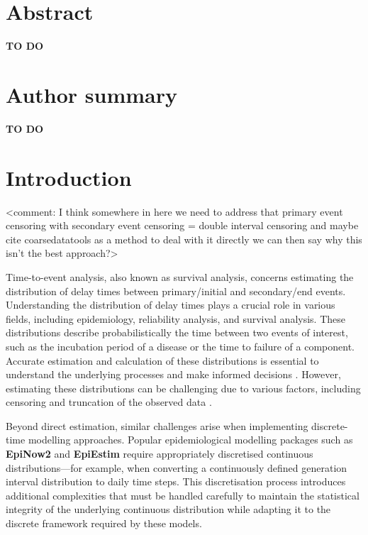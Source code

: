 \documentclass[10pt,letterpaper]{article}
\begin{document}
\section*{Abstract}
\textbf{TO DO}



\section*{Author summary}
\textbf{TO DO}

\linenumbers

\section*{Introduction}

<comment: I think somewhere in here we need to address that primary event censoring with secondary event censoring = double interval censoring and maybe cite coarsedatatools as a method to deal with it directly we can then say why this isn't the best approach?>

Time-to-event analysis, also known as survival analysis, concerns estimating the distribution of delay times between primary/initial and secondary/end events. Understanding the distribution of delay times plays a crucial role in various fields, including epidemiology, reliability analysis, and survival analysis. These distributions describe probabilistically the time between two events of interest, such as the incubation period of a disease or the time to failure of a component. Accurate estimation and calculation of these distributions is essential to understand the underlying processes and make informed decisions \cite{charniga2024best}. However, estimating these distributions can be challenging due to various factors, including censoring and truncation of the observed data \cite{Park2024.01.12.24301247}.

Beyond direct estimation, similar challenges arise when implementing discrete-time modelling approaches. Popular epidemiological modelling packages such as \textbf{EpiNow2} \cite{abbottepinow2} and \textbf{EpiEstim} \cite{Cori2013} require appropriately discretised continuous distributions—for example, when converting a continuously defined generation interval distribution to daily time steps. This discretisation process introduces additional complexities that must be handled carefully to maintain the statistical integrity of the underlying continuous distribution while adapting it to the discrete framework required by these models.
\end{document}
